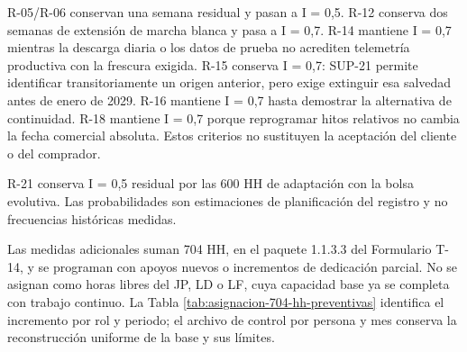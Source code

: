 \documentclass[anexo]{../../comun/overfore}
\begin{document}
\begin{horizontal}
R-05/R-06 conservan una semana residual y pasan a I = 0,5. R-12 conserva dos semanas de extensión de marcha blanca y pasa a I = 0,7. R-14 mantiene I = 0,7 mientras la descarga diaria o los datos de prueba no acrediten telemetría productiva con la frescura exigida. R-15 conserva I = 0,7: SUP-21 permite identificar transitoriamente un origen anterior, pero exige extinguir esa salvedad antes de enero de 2029. R-16 mantiene I = 0,7 hasta demostrar la alternativa de continuidad. R-18 mantiene I = 0,7 porque reprogramar hitos relativos no cambia la fecha comercial absoluta. Estos criterios no sustituyen la aceptación del cliente o del comprador.

R-21 conserva I = 0,5 residual por las 600 HH de adaptación con la bolsa evolutiva. Las probabilidades son estimaciones de planificación del registro y no frecuencias históricas medidas.

Las medidas adicionales suman 704 HH, en el paquete 1.1.3.3 del Formulario T-14, y se programan con apoyos nuevos o incrementos de dedicación parcial. No se asignan como horas libres del JP, LD o LF, cuya capacidad base ya se completa con trabajo continuo. La Tabla \ref{tab:asignacion-704-hh-preventivas} identifica el incremento por rol y periodo; el archivo de control por persona y mes conserva la reconstrucción uniforme de la base y sus límites.


\end{horizontal}
\end{document}
